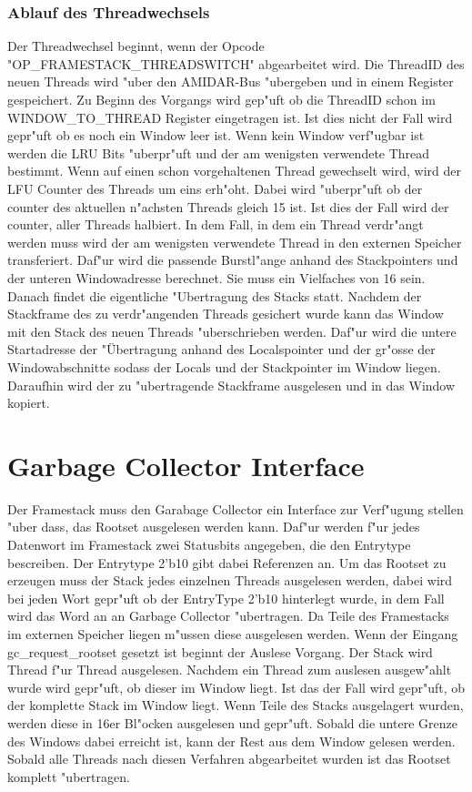 \subsubsection{Ablauf des Threadwechsels}
Der Threadwechsel beginnt, wenn der Opcode "OP\_FRAMESTACK\_THREADSWITCH" abgearbeitet wird. Die ThreadID des neuen Threads wird "uber den AMIDAR-Bus "ubergeben und in einem Register gespeichert. Zu Beginn des Vorgangs wird gep"uft ob die ThreadID schon im WINDOW\_TO\_THREAD Register eingetragen ist. Ist dies nicht der Fall wird gepr"uft ob es noch ein Window leer ist. 
Wenn kein Window verf"ugbar ist werden die LRU Bits "uberpr"uft und der am wenigsten verwendete Thread bestimmt. Wenn auf einen schon vorgehaltenen Thread gewechselt wird, wird der LFU Counter des Threads um eins erh"oht. Dabei wird "uberpr"uft ob der counter des aktuellen n"achsten Threads gleich 15 ist. Ist dies der Fall wird der counter, aller Threads halbiert. 
In dem Fall, in dem ein Thread verdr"angt werden muss wird der am wenigsten verwendete Thread in den externen Speicher transferiert. Daf"ur wird die passende Burstl"ange anhand des Stackpointers und der unteren Windowadresse berechnet. Sie muss ein Vielfaches von 16 sein. Danach findet die eigentliche "Ubertragung des Stacks statt. 
Nachdem der Stackframe des zu verdr"angenden Threads gesichert wurde kann das Window mit den Stack des neuen Threads "uberschrieben werden. Daf"ur wird die untere Startadresse der "Übertragung anhand des Localspointer und der gr"o{ss}e der Windowabschnitte soda{ss} der Locals und der Stackpointer im Window liegen. Daraufhin wird der zu "ubertragende Stackframe ausgelesen und in das Window kopiert.  

\section{Garbage Collector Interface}

Der Framestack muss den Garabage Collector ein Interface zur Verf"ugung stellen "uber dass, das Rootset ausgelesen werden kann. Daf"ur werden f"ur jedes Datenwort im Framestack zwei Statusbits angegeben, die den Entrytype bescreiben. Der Entrytype 2'b10 gibt dabei Referenzen an. Um das Rootset zu erzeugen muss der Stack jedes einzelnen Threads ausgelesen werden, dabei wird bei jeden Wort gepr"uft ob der EntryType 2'b10 hinterlegt wurde, in dem Fall wird das Word an an Garbage Collector "ubertragen. Da Teile des Framestacks im externen Speicher liegen m"ussen diese ausgelesen werden.
Wenn der Eingang gc\_request\_rootset gesetzt ist beginnt der Auslese Vorgang. Der Stack wird Thread f"ur Thread ausgelesen. Nachdem ein Thread zum auslesen ausgew"ahlt wurde wird gepr"uft, ob dieser im Window liegt. Ist das der Fall wird gepr"uft, ob der komplette Stack im Window liegt. Wenn Teile des Stacks ausgelagert wurden, werden diese in 16er Bl"ocken ausgelesen und gepr"uft. Sobald die untere Grenze des Windows dabei erreicht ist, kann der Rest aus dem Window gelesen werden. Sobald alle Threads nach diesen Verfahren abgearbeitet wurden ist das Rootset komplett "ubertragen. 

